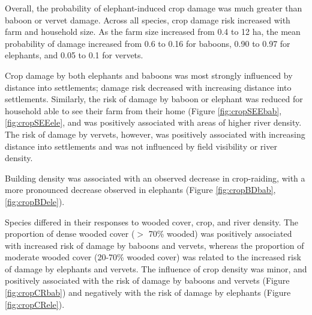 \documentclass[12pt,]{article}
\begin{document}
 Overall, the probability of elephant-induced crop damage was much greater than baboon or vervet damage. Across all species, crop damage risk increased with farm and household size. As the farm size increased from 0.4 to 12 ha, the mean probability of damage increased from 0.6 to 0.16 for baboons, 0.90 to 0.97 for elephants, and 0.05 to 0.1 for vervets.
 
 Crop damage by both elephants and baboons was most strongly influenced by distance into settlements; damage risk decreased with increasing distance into settlements. Similarly, the risk of damage by baboon or elephant was reduced for household able to see their farm from their home (Figure \ref{fig:cropSEEbab}, \ref{fig:cropSEEele}, and was positively associated with areas of higher river density. The risk of damage by vervets, however, was positively associated with increasing distance into settlements and was not influenced by field visibility or river density. 
 
 Building density was associated with an observed decrease in crop-raiding, with a more pronounced decrease observed in elephants (Figure \ref{fig:cropBDbab}, \ref{fig:cropBDele}). 

 Species differed in their responses to wooded cover, crop, and river density. The proportion of dense wooded cover ($>$ 70\% wooded) was positively associated with increased risk of damage by baboons and vervets, whereas the proportion of moderate wooded cover (20-70\% wooded cover) was related to the increased risk of damage by elephants and vervets. The influence of crop density was minor, and positively associated with the risk of damage by baboons and vervets (Figure \ref{fig:cropCRbab}) and negatively with the risk of damage by elephants (Figure \ref{fig:cropCRele}). 
 
\end{document}
